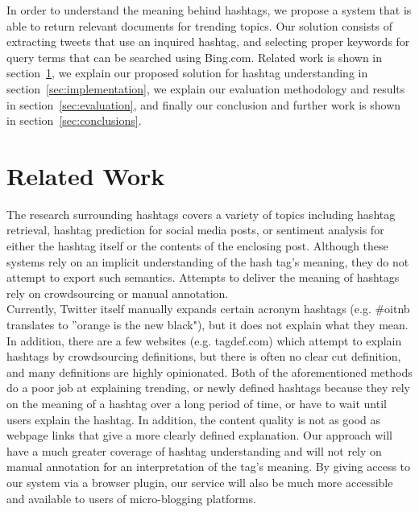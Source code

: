 \documentclass{sig-alternate}
\begin{document}
In order to understand the meaning behind hashtags, we propose a system that is able to return relevant documents for trending topics. Our solution consists of extracting tweets that use an inquired hashtag, and selecting proper keywords for query terms that can be searched using Bing.com. Related work is shown in section~\ref{sec:relatedWork}, we explain our proposed solution for hashtag understanding in  section~\ref{sec:implementation}, we explain our evaluation methodology and results in section~\ref{sec:evaluation}, and finally our conclusion and further work is shown in section~\ref{sec:conclusions}.
\\

\section{Related Work}
\label{sec:relatedWork}
The research surrounding hashtags covers a variety of topics including hashtag retrieval\cite{efron:retrieval}, hashtag prediction\cite{khabiri:predict}\cite{tagspace} for social media posts, or sentiment analysis for either the hashtag itself or the contents of the enclosing post.  Although these systems rely on an implicit understanding of the hash tag's meaning, they do not attempt to export such semantics.  Attempts to deliver the meaning of hashtags rely on crowdsourcing or manual annotation.\\
Currently, Twitter itself manually expands certain acronym hashtags (e.g. \#oitnb translates to ''orange is the new black"), but it does not explain what they mean. In addition, there are a few websites (e.g. tagdef.com) which attempt to explain hashtags by crowdsourcing definitions, but there is often no clear cut definition, and many definitions are highly opinionated. Both of the aforementioned methods do a poor job at explaining trending, or newly defined hashtags because they rely on the meaning of a hashtag over a long period of time, or have to wait until users explain the hashtag. In addition, the content quality is not as good as webpage links that give a more clearly defined explanation.
Our approach will have a much greater coverage of hashtag understanding and will not rely on manual annotation for an interpretation of the tag's meaning.  By giving access to our system via a browser plugin, our service will also be much more accessible and available to users of micro-blogging platforms.\\
\end{document}
